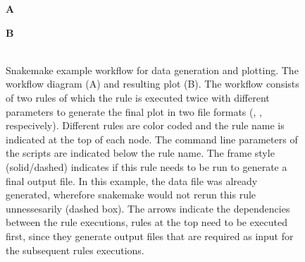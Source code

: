 \begin{figure}
    \begin{minipage}[t]{0.4\textwidth}
    \textbf{A}\\
    
    \end{minipage}
    \begin{minipage}[t]{0.6\textwidth}
    \textbf{B}\\
    \\
    \end{minipage}
 \caption[Snakemake example workflow for data generation and plotting]{Snakemake example workflow for data generation and plotting. The workflow diagram (A) and resulting plot (B). The workflow consists of two rules of which the  rule is executed twice with different parameters to generate the final plot in two file formats (, , respecively). Different rules are color coded and the rule name is indicated at the top of each node.  The command line parameters of the scripts are indicated below the rule name. The frame style (solid/dashed) indicates if this rule needs to be run to generate a final output file. In this example, the data file was already generated, wherefore snakemake would not rerun this rule unnessesarily (dashed box). The arrows indicate the dependencies between the rule executions, rules at the top need to be executed first, since they generate output files that are required as input for the subsequent rules executions.}
\label{fig:python_demo}
\end{figure}


